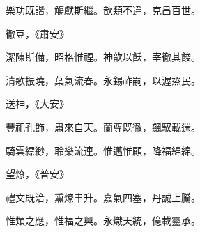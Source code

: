 \begin{pinyinscope}
 樂功既諧，觴獻斯繼。歆類不違，克昌百世。



 徹豆，《肅安》



 潔陳斯備，昭格惟禋。神歆以飫，宰徹其餕。



 清歌振曉，葉氣流春。永錫祚嗣，以渥烝民。



 送神，《大安》



 豐祀孔飾，肅來自天。蘭尊既徹，飆馭載遄。



 騎雲縹緲，聆樂流連。惟邁惟顧，降福綿綿。



 望燎，《普安》



 禮文既洽，熏燎聿升。嘉氣四塞，丹誠上騰。



 惟類之應，惟福之興。永熾天統，億載靈承。



\end{pinyinscope}